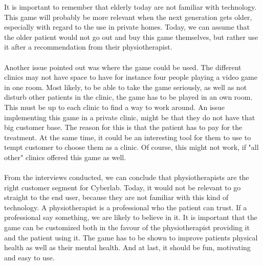 It is important to remember that elderly today are not familiar with technology. This game will probably be more relevant when the next generation gets older, especially with regard to the use in private homes. Today, we can assume that the older patient would not go out and buy this game themselves, but rather use it after a recommendation from their physiotherapist. \\ \\
Another issue pointed out was where the game could be used. The different clinics may not have space to have for instance four people playing a video game in one room. Most likely, to be able to take the game seriously, as well as not disturb other patients in the clinic, the game has to be played in an own room. This must be up to each clinic to find a way to work around. An issue implementing this game in a private clinic, might be that they do not have that big customer base. The reason for this is that the patient has to pay for the treatment. At the same time, it could be an interesting tool for them to use to tempt customer to choose them as a clinic. Of course, this might not work, if "all other" clinics offered this game as well. \\ \\
From the interviews conducted, we can conclude that physiotherapists are the right customer segment for Cyberlab. Today, it would not be relevant to go straight to the end user, because they are not familiar with this kind of technology. A physiotherapist is a professional who the patient can trust. If a professional say something, we are likely to believe in it.  It is important that the game can be customized both in the favour of the physiotherapist providing it and the patient using it. The game has to be shown to improve patients physical health as well as their mental health. And at last, it should be fun, motivating and easy to use. 